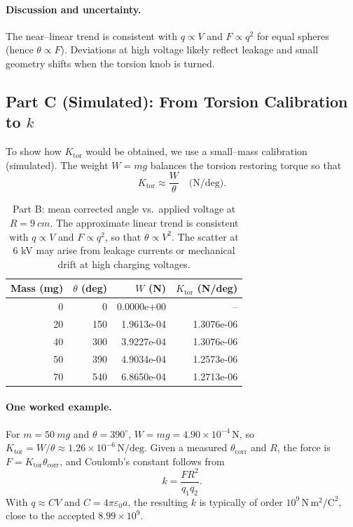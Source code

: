 \documentclass[12pt]{article}
\begin{document}
\paragraph{Discussion and uncertainty.}
The near–linear trend is consistent with $q\propto V$ and $F\propto q^2$ for equal spheres (hence $\theta\propto F$). Deviations at high voltage likely reflect leakage and small geometry shifts when the torsion knob is turned.


\subsection*{Part C (Simulated): From Torsion Calibration to $k$}
To show how $K_{\mathrm{tor}}$ would be obtained, we use a small--mass calibration (simulated). The weight $W=mg$ balances the torsion restoring torque so that
\[
K_{\mathrm{tor}} \approx \frac{W}{\theta}\quad\text{(N/deg)}.
\]
\begin{table}[H]
\centering
\caption{Part B: mean corrected angle vs.\ applied voltage at $R=\SI{9}{cm}$. The approximate linear trend is consistent with $q\propto V$ and $F\propto q^2$, so that $\theta\propto V^2$. The scatter at 6 kV may arise from leakage currents or mechanical drift at high charging voltages.}
\begin{tabular}{@{}rrrr@{}}
\toprule
Mass (mg) & $\theta$ (deg) & $W$ (N) & $K_{\mathrm{tor}}$ (N/deg) \\
\midrule
0  & 0   & 0.0000e+00 & -- \\
20 & 150 & 1.9613e-04 & 1.3076e-06 \\
40 & 300 & 3.9227e-04 & 1.3076e-06 \\
50 & 390 & 4.9034e-04 & 1.2573e-06 \\
70 & 540 & 6.8650e-04 & 1.2713e-06 \\
\bottomrule
\end{tabular}
\end{table}

\paragraph{One worked example.}
For $m=\SI{50}{mg}$ and $\theta=390^\circ$, $W=mg=4.90\times10^{-4}\,\mathrm{N}$, so
$K_{\mathrm{tor}}=W/\theta\approx 1.26\times10^{-6}\,\mathrm{N/deg}$.
Given a measured $\theta_{\mathrm{corr}}$ and $R$, the force is $F=K_{\mathrm{tor}}\theta_{\mathrm{corr}}$, and Coulomb's constant follows from
\[
k=\frac{F R^2}{q_1 q_2}.
\]
With $q\approx CV$ and $C=4\pi\varepsilon_0 a$, the resulting $k$ is typically of order $10^9\,\mathrm{N\,m^2/C^2}$, close to the accepted $8.99\times10^9$.
\end{document}
